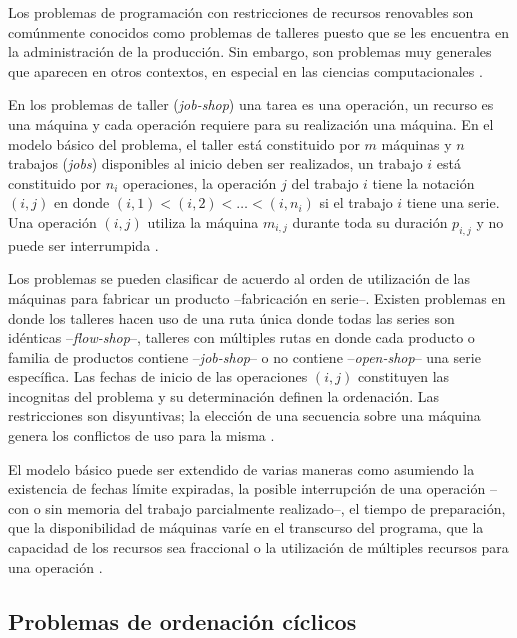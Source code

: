 \documentclass[spanish,draft,12pt,headsepline,footsepline,paper=letter]{scrreprt}
\begin{document}
Los problemas de programación con restricciones de recursos renovables son comúnmente conocidos como problemas de talleres puesto que se les encuentra en la administración de la producción. Sin embargo, son problemas muy generales que aparecen en otros contextos, en especial en las ciencias computacionales \citep[p.~101]{gotha93les-problemes-dordonnancement}.

En los problemas de taller (\textit{job-shop}) una tarea es una operación, un recurso es una máquina y cada operación requiere para su realización una máquina. En el modelo básico del problema, el taller está constituido por $m$ máquinas y $n$ trabajos (\textit{jobs}) disponibles al inicio deben ser realizados, un trabajo $i$ está constituido por $n_i$ operaciones, la operación $j$ del trabajo $i$ tiene la notación $(i,j)$ en donde $(i,1)<(i,2)<\ldots<(i,n_i)$ si el trabajo $i$ tiene una serie. Una operación $(i,j)$ utiliza la máquina $m_{i,j}$ durante toda su duración $p_{i,j}$ y no puede ser interrumpida \citep[p.~102]{gotha93les-problemes-dordonnancement}.

Los problemas se pueden clasificar de acuerdo al orden de utilización de las máquinas para fabricar un producto –fabricación en serie–. Existen problemas en donde los talleres hacen uso de una ruta única donde todas las series son idénticas –\textit{flow-shop}–, talleres con múltiples rutas en donde cada producto o familia de productos contiene –\textit{job-shop}– o no contiene –\textit{open-shop}– una serie específica. Las fechas de inicio de las operaciones $(i,j)$ constituyen las incognitas del problema y su determinación definen la ordenación. Las restricciones son disyuntivas; la elección de una secuencia sobre una máquina genera los conflictos de uso para la misma \citep[p.~102]{gotha93les-problemes-dordonnancement}.

El modelo básico puede ser extendido de varias maneras como asumiendo la existencia de fechas límite expiradas, la posible interrupción de una operación –con o sin memoria del trabajo parcialmente realizado–, el tiempo de preparación, que la disponibilidad de máquinas varíe en el transcurso del programa, que la capacidad de los recursos sea fraccional o la utilización de múltiples recursos para una operación \citep[p.~102]{gotha93les-problemes-dordonnancement}.


\subsection{Problemas de ordenación cíclicos}
\label{problemas_ordenacion_ciclicos}
\end{document}
